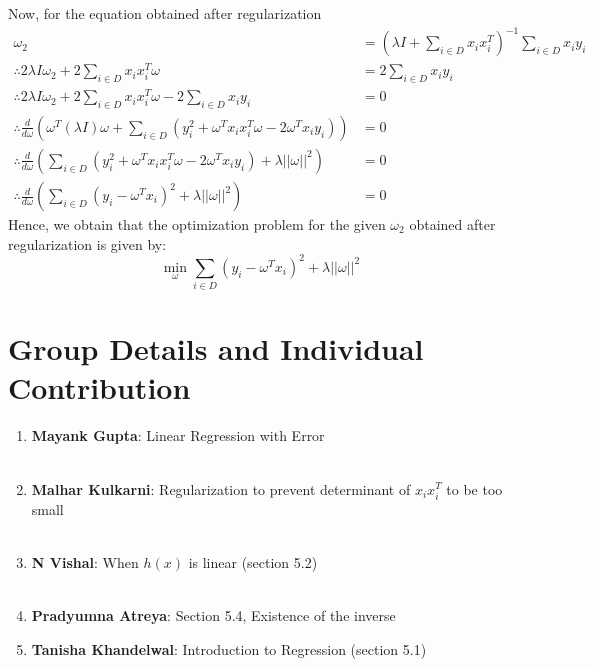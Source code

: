 \documentclass[11pt, twosides]{article}
\begin{document}
Now, for the equation obtained after regularization
\begin{align*}
    \omega_2 &= (\lambda I + \sum_{i \in D} x_ix_i^T)^{-1} \sum_{i \in D} x_iy_i \\
    \therefore 2\lambda I \omega_2 + 2\sum_{i \in D} x_ix_i^T \omega &= 2\sum_{i \in D} x_iy_i\\
    \therefore 2\lambda I \omega_2 + 2\sum_{i \in D} x_ix_i^T \omega - 2\sum_{i \in D} x_iy_i &= 0\\
    \therefore \frac{d}{d\omega} (\omega^T (\lambda I) \omega + \sum_{i \in D} (y_i^2 + \omega^T x_ix_i^T \omega - 2\omega^Tx_iy_i)) &= 0\\
    \therefore \frac{d}{d\omega} (\sum_{i \in D} (y_i^2 + \omega^T x_ix_i^T \omega - 2\omega^Tx_iy_i) + \lambda ||\omega||^2) &= 0\\
    \therefore \frac{d}{d\omega} (\sum_{i \in D} (y_i - \omega^T x_i)^2 + \lambda ||\omega||^2) &= 0
\end{align*}
Hence, we obtain that the optimization problem for the given $\omega_2$ obtained after regularization is given by:\\
\color{blue}
\begin{equation*}
    \min_{\omega} \sum_{i \in D} (y_i - \omega^Tx_i)^2 + \lambda ||\omega||^2
\end{equation*}
\color{black}
\section{Group Details and Individual Contribution}
\begin{enumerate}
    \item {\bf Mayank Gupta}: Linear Regression with Error\\
    \\
    \item {\bf Malhar Kulkarni}: Regularization to prevent determinant of $x_ix_i^T$ to be too small\\
    \\
    \item {\bf N Vishal}: When $h(x)$ is linear (section 5.2)\\
    \\
    \item {\bf Pradyumna Atreya}: Section 5.4, Existence of the inverse 
    \\
    \item {\bf Tanisha Khandelwal}: Introduction to Regression (section 5.1)\\
    \\
\end{enumerate}
\end{document}
